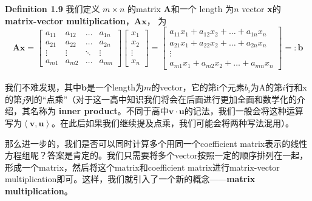 \documentclass{report}
\def\defb{\begin{tcolorbox} [colback=yellow!20, colframe=orange!80, sharp corners, leftrule={5pt}, rightrule={0pt}, toprule={0pt}, bottomrule={0pt}, left={2pt}, right={2pt}, top={3pt}, bottom={3pt}]}
\def\defe{\end{tcolorbox}}
\def\v{\mathbf{v}}
\def\u{\mathbf{u}}
\def\<{\left\langle}
\def\>{\right\rangle}
\begin{document}
\defb 
	\textbf{Definition 1.9}
	我们定义 $ m \times n $ 的matrix \textbf{A}和一个 length 为$ n $ vector \textbf{x}的\textbf{matrix-vector multiplication}，$ \mathbf{Ax} $， 为
	$$ \mathbf{Ax} =
	 \left[ \begin{matrix}
		a_{11} & a_{12} & \dots & a_{1n} \\
		a_{21} & a_{22} & \dots & a_{2n} \\
		\vdots & \vdots & \ddots & \vdots \\
		a_{m1} & a_{m2} & \dots & a_{mn}
	\end{matrix}\right]
	\left[ \begin{matrix}
		x_1 \\
		x_2 \\
		\vdots \\
		x_n
	\end{matrix}\right]
	=
	\left[ \begin{matrix}
		a_{11}x_1 + a_{12}x_2 + \dots + a_{1n}x_n \\
		a_{21}x_1 + a_{22}x_2 + \dots + a_{2n}x_n \\
		\vdots \\
		a_{m1}x_1 + a_{m2}x_2 + \dots + a_{mn}x_n
	\end{matrix}\right]
	=: \mathbf{b}
	$$
	\\

	我们不难发现，其中$ \mathbf{b} $是一个length为$ m $的vector，它的第i个元素$ b_{i} $为A的第$i$行和x的第$j$列的“点乘”（对于这一高中知识我们将会在后面进行更加全面和数学化的介绍，其名称为 \textbf{inner product}。不同于高中$\v \cdot \u $的记法，我们一般会将这种运算写为$\< \v , \u \> $。在此后如果我们继续提及点乘，我们可能会将两种写法混用）。

\defe

那么进一步的，我们是否可以同时计算多个用同一个coefficient matrix表示的线性方程组呢？答案是肯定的。我们只需要将多个vector按照一定的顺序排列在一起，形成一个matrix，然后将这个matrix和coefficient matrix进行matrix-vector multiplication即可。这样，我们就引入了一个新的概念——\textbf{matrix multiplication}。
\end{document}
